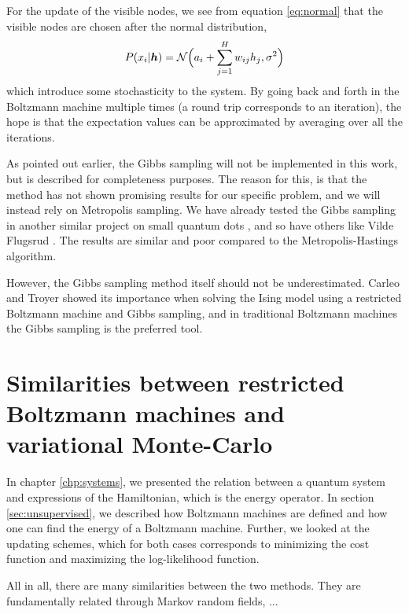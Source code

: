 For the update of the visible nodes, we see from equation \eqref{eq:normal} that the visible nodes are chosen after the normal distribution,
\begin{equation}
P(x_i|\boldsymbol{{h}})=\mathcal{N}\Big(a_i+\sum_{j=1}^Hw_{ij}h_j,\sigma^2\Big)
\end{equation}
which introduce some stochasticity to the system. By going back and forth in the Boltzmann machine multiple times (a round trip corresponds to an iteration), the hope is that the expectation values can be approximated by averaging over all the iterations. 

As pointed out earlier, the Gibbs sampling will not be implemented in this work, but is described for completeness purposes. The reason for this, is that the method has not shown promising results for our specific problem, and we will instead rely on Metropolis sampling. We have already tested the Gibbs sampling in another similar project on small quantum dots \cite{nordhagen_computational_2018}, and so have others like Vilde Flugsrud \cite{flugsrud_vilde_moe_solving_nodate}. The results are similar and poor compared to the Metropolis-Hastings algorithm.

However, the Gibbs sampling method itself should not be underestimated. Carleo and Troyer showed its importance when solving the Ising model using a restricted Boltzmann machine and Gibbs sampling, and in traditional Boltzmann machines the Gibbs sampling is the preferred tool. \cite{carleo_solving_2017}

\section{Similarities between restricted Boltzmann machines and variational Monte-Carlo}
In chapter \ref{chp:systems}, we presented the relation between a quantum system and expressions of the Hamiltonian, which is the energy operator. In section \ref{sec:unsupervised}, we described how Boltzmann machines are defined and how one can find the energy of a Boltzmann machine. Further, we looked at the updating schemes, which for both cases corresponds to minimizing the cost function and maximizing the log-likelihood function. 

All in all, there are many similarities between the two methods. They are fundamentally related through Markov random fields, ...

